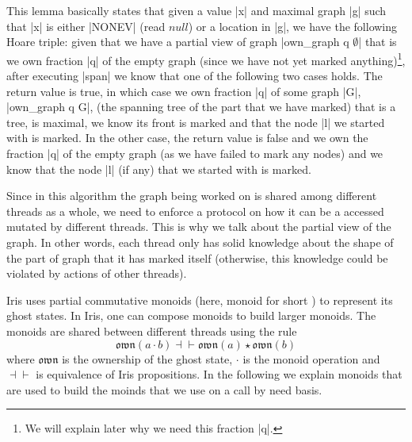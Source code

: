 \documentclass[nocopyrightspace]{sigplanconf}
\newcommand{\own}{\mathfrak{own}}
\begin{document}
This lemma basically states that given a value \Coqe|x| and maximal graph
\Coqe|g| such that \Coqe|x| is either \Coqe|NONEV| (read $\mathit{null}$) or a location in \Coqe|g|, we have the following Hoare triple:
given that we have a partial view of graph \Coqe|own_graph q $\emptyset$| that is we own fraction \Coqe|q| of the empty graph
(since we have not yet marked anything)\footnote {We will explain later why we need this fraction \Coqe|q|.}, after executing \Coqe|span|
we know that one of the following two cases holds.
The return value is true, in which case we own fraction \Coqe|q| of some
graph \Coqe|G|, \Coqe|own_graph q G|, (the spanning tree of the part that we have marked) that
is a tree, is maximal, we know its front is marked and that the node \Coqe|l| we started with is marked.
In the other case, the return value is false and we own the fraction \Coqe|q| of the empty graph (as we have failed to mark any nodes)
and we know that the node \Coqe|l| (if any) that we started with is marked.

Since in this algorithm the graph being worked on is shared among different threads as a whole, we need to enforce a protocol on how it
can be a accessed mutated by different threads.
This is why we talk about the partial view of the graph.
In other words, each thread only has solid knowledge about the shape of
the part of graph that it has marked itself (otherwise, this knowledge could be violated by actions of other threads).

Iris uses partial commutative monoids (here, monoid for short ) to represent its ghost states.
In Iris, one can compose monoids to build larger monoids.
The monoids are shared between different threads using the rule
\[
\own(a \cdot b) \dashv\vdash \own(a) \star \own(b)
\]
where $\own$ is the ownership of the ghost state, $\cdot$ is the monoid
operation and $\dashv\vdash$ is equivalence of Iris propositions.
In the following we explain monoids that are used to build the moinds
that we use on a call by need basis.
\end{document}
